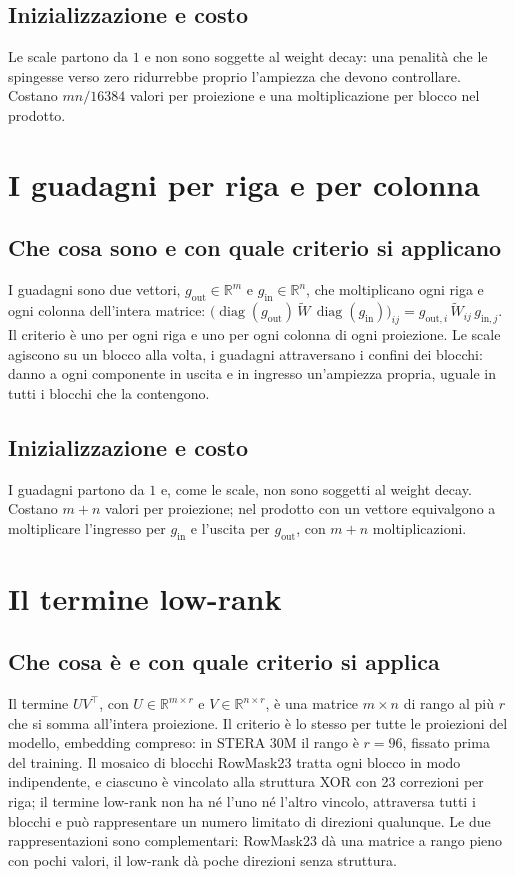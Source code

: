 \subsection{Inizializzazione e costo}
Le scale partono da $1$ e non sono soggette al weight decay: una penalità che le spingesse verso zero ridurrebbe proprio l'ampiezza che devono controllare. Costano $mn/16384$ valori per proiezione e una moltiplicazione per blocco nel prodotto.

\section{I guadagni per riga e per colonna}
\label{sec:guadagni}

\subsection{Che cosa sono e con quale criterio si applicano}
I guadagni sono due vettori, $g_{\mathrm{out}}\in\mathbb{R}^m$ e $g_{\mathrm{in}}\in\mathbb{R}^n$, che moltiplicano ogni riga e ogni colonna dell'intera matrice: $\big(\operatorname{diag}(g_{\mathrm{out}})\,\widetilde W\,\operatorname{diag}(g_{\mathrm{in}})\big)_{ij} = g_{\mathrm{out},i}\,\widetilde W_{ij}\,g_{\mathrm{in},j}$. Il criterio è uno per ogni riga e uno per ogni colonna di ogni proiezione. Le scale agiscono su un blocco alla volta, i guadagni attraversano i confini dei blocchi: danno a ogni componente in uscita e in ingresso un'ampiezza propria, uguale in tutti i blocchi che la contengono.

\subsection{Inizializzazione e costo}
I guadagni partono da $1$ e, come le scale, non sono soggetti al weight decay. Costano $m+n$ valori per proiezione; nel prodotto con un vettore equivalgono a moltiplicare l'ingresso per $g_{\mathrm{in}}$ e l'uscita per $g_{\mathrm{out}}$, con $m+n$ moltiplicazioni.

\section{Il termine low-rank}
\label{sec:basso-rango}

\subsection{Che cosa è e con quale criterio si applica}
Il termine $UV^\top$, con $U\in\mathbb{R}^{m\times r}$ e $V\in\mathbb{R}^{n\times r}$, è una matrice $m\times n$ di rango al più $r$ che si somma all'intera proiezione. Il criterio è lo stesso per tutte le proiezioni del modello, embedding compreso: in STERA 30M il rango è $r=96$, fissato prima del training. Il mosaico di blocchi RowMask23 tratta ogni blocco in modo indipendente, e ciascuno è vincolato alla struttura XOR con 23 correzioni per riga; il termine low-rank non ha né l'uno né l'altro vincolo, attraversa tutti i blocchi e può rappresentare un numero limitato di direzioni qualunque. Le due rappresentazioni sono complementari: RowMask23 dà una matrice a rango pieno con pochi valori, il low-rank dà poche direzioni senza struttura.


